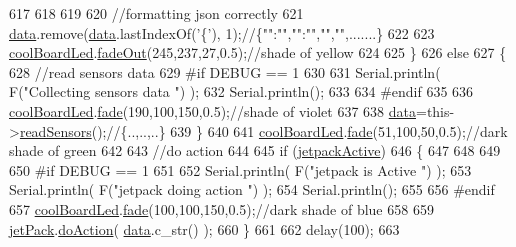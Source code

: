 \begin{DoxyCode}
617 
618         
619 
620         \textcolor{comment}{//formatting json correctly}
621         \hyperlink{class_cool_board_a427fb753dd8575bdf821c70a5c63d695}{data}.remove(\hyperlink{class_cool_board_a427fb753dd8575bdf821c70a5c63d695}{data}.lastIndexOf(\textcolor{charliteral}{'\{'}), 1);\textcolor{comment}{//\{"":"","":"","","",.......\}}
622 
623         \hyperlink{class_cool_board_a1b1d3c684a5baa56b08486e192fd8e97}{coolBoardLed}.\hyperlink{class_cool_board_led_a93d545679237e8cc858324367149775c}{fadeOut}(245,237,27,0.5);\textcolor{comment}{//shade of yellow}
624                 
625     \}   
626     \textcolor{keywordflow}{else}
627     \{
628         \textcolor{comment}{//read sensors data}
629 \textcolor{preprocessor}{    #if DEBUG == 1}
630 
631         Serial.println( F(\textcolor{stringliteral}{"Collecting sensors data "}) );
632         Serial.println();
633 
634 \textcolor{preprocessor}{    #endif}
635 
636         \hyperlink{class_cool_board_a1b1d3c684a5baa56b08486e192fd8e97}{coolBoardLed}.\hyperlink{class_cool_board_led_af1cacbaa88db8bcf6042c1083ba41155}{fade}(190,100,150,0.5);\textcolor{comment}{//shade of violet        }
637 
638         \hyperlink{class_cool_board_a427fb753dd8575bdf821c70a5c63d695}{data}=this->\hyperlink{class_cool_board_ad03abdce2e65f520bbf2cff0f2d083cf}{readSensors}();\textcolor{comment}{//\{..,..,..\}}
639     \}
640 
641     \hyperlink{class_cool_board_a1b1d3c684a5baa56b08486e192fd8e97}{coolBoardLed}.\hyperlink{class_cool_board_led_af1cacbaa88db8bcf6042c1083ba41155}{fade}(51,100,50,0.5);\textcolor{comment}{//dark shade of green  }
642 
643     \textcolor{comment}{//do action}
644 
645     \textcolor{keywordflow}{if} (\hyperlink{class_cool_board_a9be03a913d26e558328935ca3b59a75e}{jetpackActive})
646     \{
647     
648 
649 
650 \textcolor{preprocessor}{    #if DEBUG == 1}
651 
652         Serial.println( F(\textcolor{stringliteral}{"jetpack is Active "}) );
653         Serial.println( F(\textcolor{stringliteral}{"jetpack doing action "}) );
654         Serial.println();
655     
656 \textcolor{preprocessor}{    #endif}
657         \hyperlink{class_cool_board_a1b1d3c684a5baa56b08486e192fd8e97}{coolBoardLed}.\hyperlink{class_cool_board_led_af1cacbaa88db8bcf6042c1083ba41155}{fade}(100,100,150,0.5);\textcolor{comment}{//dark shade of blue }
658     
659         \hyperlink{class_cool_board_a30b1357881b01ccbec676856a91e48e9}{jetPack}.\hyperlink{class_jetpack_a9e703197093094b963f9ad57817495b8}{doAction}( \hyperlink{class_cool_board_a427fb753dd8575bdf821c70a5c63d695}{data}.c\_str() );
660     \}
661     
662     delay(100);
663 

\end{DoxyCode}
